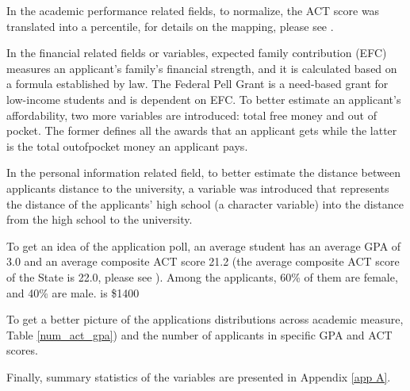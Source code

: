 \documentclass[12pt,english]{report}
\begin{document}
In the academic performance related fields, to normalize, the ACT score was
translated
into a percentile, for details on the mapping, please see
\citet{ACT_percentile}.
 
In the financial related fields or variables, expected family contribution
(EFC) measures
an applicant's family's financial strength, and it is calculated based on a
formula 
established by law. The Federal Pell Grant is a need-based grant for low-income
students and is dependent on EFC. To better estimate an applicant's
affordability, 
two more variables are introduced: total free money and out of pocket. The
former
defines all the awards that an applicant gets while  the latter is the total 
out\-of\-pocket money an applicant pays.

In the personal information related field, to better estimate the distance
between
applicants distance to the university, a variable was introduced that
represents
the distance of the applicants' high school (a character variable) into the
distance
from the high school to the university.

To get an idea of the application poll, an average student has an average GPA
of
3.0 and an average composite ACT score 21.2 (the average composite ACT score of
the State is 22.0, please see \citet{mean_sat}). Among the applicants, 60\% of 
them are female, and 40\% are male.  %
is \$1400
    
To get a better picture of the applications distributions across academic
measure,
Table \ref{num_act_gpa}) and the number of applicants in specific GPA and ACT
scores. 

Finally, summary statistics of the variables are presented in Appendix \ref{app
A}.
\end{document}
